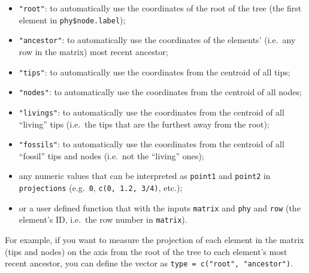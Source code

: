 \documentclass[
]{book}
\providecommand{\tightlist}{%
  \setlength{\itemsep}{0pt}\setlength{\parskip}{0pt}}
\begin{document}
\begin{itemize}
\tightlist
\item
  \texttt{"root"}: to automatically use the coordinates of the root of the tree (the first element in \texttt{phy\$node.label});
\item
  \texttt{"ancestor"}: to automatically use the coordinates of the elements' (i.e.~any row in the matrix) most recent ancestor;
\item
  \texttt{"tips"}: to automatically use the coordinates from the centroid of all tips;
\item
  \texttt{"nodes"}: to automatically use the coordinates from the centroid of all nodes;
\item
  \texttt{"livings"}: to automatically use the coordinates from the centroid of all ``living'' tips (i.e.~the tips that are the furthest away from the root);
\item
  \texttt{"fossils"}: to automatically use the coordinates from the centroid of all ``fossil'' tips and nodes (i.e.~not the ``living'' ones);
\item
  any numeric values that can be interpreted as \texttt{point1} and \texttt{point2} in \texttt{projections} (e.g.~\texttt{0}, \texttt{c(0,\ 1.2,\ 3/4)}, etc.);
\item
  or a user defined function that with the inputs \texttt{matrix} and \texttt{phy} and \texttt{row} (the element's ID, i.e.~the row number in \texttt{matrix}).
\end{itemize}

For example, if you want to measure the projection of each element in the matrix (tips and nodes) on the axis from the root of the tree to each element's most recent ancestor, you can define the vector as \texttt{type\ =\ c("root",\ "ancestor")}.
\end{document}
